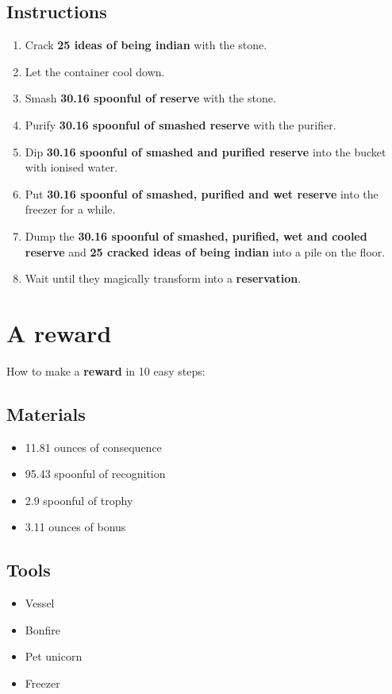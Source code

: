 \documentclass{article}
\begin{document}
\subsection{Instructions}\begin{enumerate}
\item 
Crack \textbf{25 ideas of being indian} with the stone.
\item 
Let the container cool down.
\item 
Smash \textbf{30.16 spoonful of reserve} with the stone.
\item 
Purify \textbf{30.16 spoonful of smashed reserve} with the purifier.
\item 
Dip \textbf{30.16 spoonful of smashed and purified reserve} into the bucket with ionised water.
\item 
Put \textbf{30.16 spoonful of smashed, purified and wet reserve} into the freezer for a while.
\item 
Dump the \textbf{30.16 spoonful of smashed, purified, wet and cooled reserve} and \textbf{25 cracked ideas of being indian} into a pile on the floor.
\item 
Wait until they magically transform into a \textbf{reservation}.
\end{enumerate}
\newpage
\section{A reward}How to make a \textbf{reward} in 10 easy steps:

\subsection{Materials}\begin{itemize}
\item 
11.81 ounces of consequence
\item 
95.43 spoonful of recognition
\item 
2.9 spoonful of trophy
\item 
3.11 ounces of bonus
\end{itemize}
\subsection{Tools}\begin{itemize}
\item 
Vessel
\item 
Bonfire
\item 
Pet unicorn
\item 
Freezer
\end{itemize}
\end{document}
